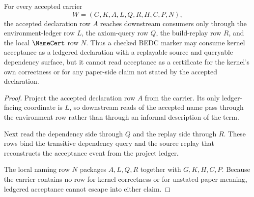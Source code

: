 \begin{theorem}
\label{thm:kernel-acceptance-audit-witness-ledger-non-escape}
For every accepted carrier
$$
W=(G,K,A,L,Q,R,H,C,P,N),
$$
the accepted declaration row $A$ reaches downstream consumers only through the environment-ledger row $L$, the axiom-query row $Q$, the build-replay row $R$, and the local $\NameCert$ row $N$. Thus a checked BEDC marker may consume kernel acceptance as a ledgered declaration with a replayable source and queryable dependency surface, but it cannot read acceptance as a certificate for the kernel's own correctness or for any paper-side claim not stated by the accepted declaration.
\end{theorem}
\begin{proof}
Project the accepted declaration row $A$ from the carrier. Its only ledger-facing coordinate is $L$, so downstream reads of the accepted name pass through the environment row rather than through an informal description of the term.

Next read the dependency side through $Q$ and the replay side through $R$. These rows bind the transitive dependency query and the source replay that reconstructs the acceptance event from the project ledger.

The local naming row $N$ packages $A,L,Q,R$ together with $G,K,H,C,P$. Because the carrier contains no row for kernel correctness or for unstated paper meaning, ledgered acceptance cannot escape into either claim.
\end{proof}

